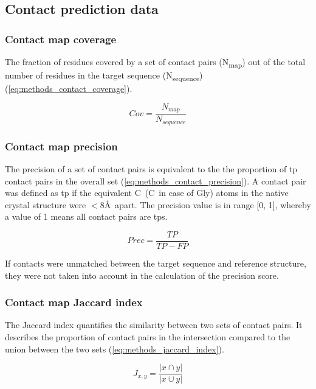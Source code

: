 \subsection{Contact prediction data}
\subsubsection{Contact map coverage}
The fraction of residues covered by a set of contact pairs (N\textsubscript{map}) out of the total number of residues in the target sequence (N\textsubscript{sequence}) (\cref{eq:methods_contact_coverage}).

\begin{equation}
Cov=\frac{N_{map}}{N_{sequence}}
\label{eq:methods_contact_coverage}
\end{equation}

\subsubsection{Contact map precision} \label{sec:methods_contact_map_prec}
The precision of a set of contact pairs is equivalent to the the proportion of \gls{tp} contact pairs in the overall set (\cref{eq:methods_contact_precision}). A contact pair was defined as \gls{tp} if the equivalent C\textbeta\ (C\textalpha\ in case of Gly) atoms in the native crystal structure were $<8$\AA\ apart. The precision value is in range [0, 1], whereby a value of 1 means all contact pairs are \gls{tp}s. 

\begin{equation} 
Prec = \frac{TP}{TP-FP}
\label{eq:methods_contact_precision}
\end{equation}

If contacts were unmatched between the target sequence and reference structure, they were not taken into account in the calculation of the precision score.
\subsubsection{Contact map Jaccard index}
The Jaccard index quantifies the similarity between two sets of contact pairs. It describes the proportion of contact pairs in the intersection compared to the union between the two sets \cite{Wuyun2016-tx} (\cref{eq:methods_jaccard_index}).

\begin{equation}
J_{x,y}=\frac{\left |x \cap y\right |}{\left |x \cup y\right |}
\label{eq:methods_jaccard_index}
\end{equation}

